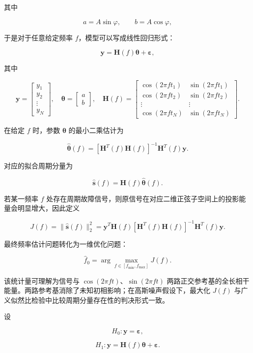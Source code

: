 \documentclass[UTF8,a4paper,12pt]{ctexart}
\numberwithin{figure}{section}
\numberwithin{table}{section}
\begin{document}
其中


\[
a=A\sin\varphi,\qquad b=A\cos\varphi,
\]


于是对于任意给定频率 \(f\)，模型可以写成线性回归形式：


\[
\mathbf{y}=\mathbf{H}(f)\boldsymbol{\theta}+\boldsymbol{\varepsilon},
\]


其中


\[
\mathbf{y}=
\begin{bmatrix}
y_1\\y_2\\\vdots\\y_N
\end{bmatrix},
\quad
\boldsymbol{\theta}=
\begin{bmatrix}
a\\b
\end{bmatrix},
\quad
\mathbf{H}(f)=
\begin{bmatrix}
\cos(2\pi f t_1) & \sin(2\pi f t_1)\\
\cos(2\pi f t_2) & \sin(2\pi f t_2)\\
\vdots & \vdots\\
\cos(2\pi f t_N) & \sin(2\pi f t_N)
\end{bmatrix}.
\]


在给定 \(f\) 时，参数 \(\boldsymbol{\theta}\) 的最小二乘估计为


\[
\hat{\boldsymbol{\theta}}(f)
=
\left[\mathbf{H}^{T}(f)\mathbf{H}(f)\right]^{-1}
\mathbf{H}^{T}(f)\mathbf{y}.
\]


对应的拟合周期分量为


\[
\hat{\mathbf{s}}(f)=\mathbf{H}(f)\hat{\boldsymbol{\theta}}(f).
\]


若某一频率 \(f\) 处存在周期故障信号，则原信号在对应二维正弦子空间上的投影能量会明显增大，因此定义


\[
J(f)=\|\hat{\mathbf{s}}(f)\|_2^2
=
\mathbf{y}^{T}\mathbf{H}(f)
\left[\mathbf{H}^{T}(f)\mathbf{H}(f)\right]^{-1}
\mathbf{H}^{T}(f)\mathbf{y}.
\]


最终频率估计问题转化为一维优化问题：


\[
\hat{f}_0=\arg\max_{f\in[f_{\min},f_{\max}]}J(f).
\]


该统计量可理解为信号与 \(\cos(2\pi ft)\)、\(\sin(2\pi ft)\) 两路正交参考基的全长相干能量。两路参考基消除了未知初相影响；在高斯噪声假设下，最大化 \(J(f)\) 与广义似然比检验中比较周期分量存在性的判决形式一致。


设


\[
H_0:\mathbf{y}=\boldsymbol{\varepsilon},
\]


\[
H_1:\mathbf{y}=\mathbf{H}(f)\boldsymbol{\theta}+\boldsymbol{\varepsilon}.
\]
\end{document}
